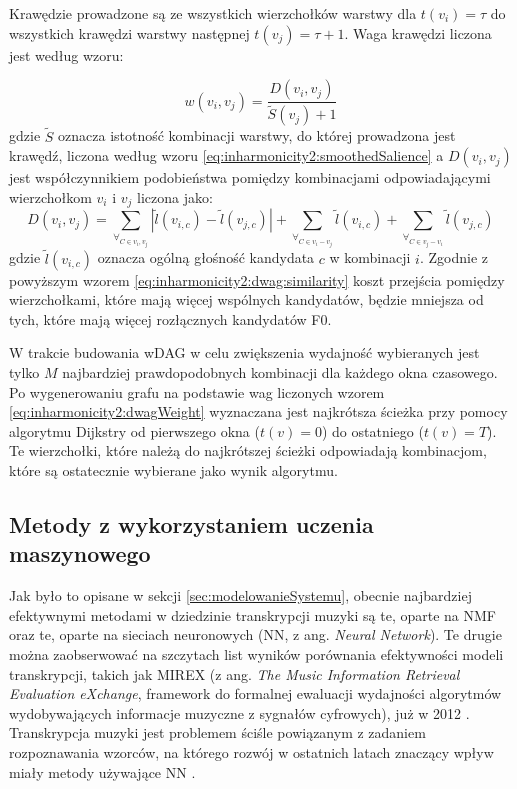 \documentclass[12pt,a4paper,twoside]{mwart}
\begin{document}
Krawędzie prowadzone są ze wszystkich wierzchołków warstwy dla $t(v_i) = \tau$ do wszystkich krawędzi warstwy następnej $t(v_j) = \tau + 1$. Waga krawędzi liczona jest według wzoru:

\begin{equation}\label{eq:inharmonicity2:dwagWeight}
w(v_i, v_j) = \frac{D(v_i, v_j)}{\widetilde{S}(v_j) + 1}
\end{equation}
gdzie $\widetilde{S}$ oznacza istotność kombinacji warstwy, do której prowadzona jest krawędź, liczona według wzoru \ref{eq:inharmonicity2:smoothedSalience} a $D(v_i, v_j)$ jest współczynnikiem podobieństwa pomiędzy kombinacjami odpowiadającymi wierzchołkom $v_i$ i $v_j$ liczona jako:
\begin{equation}\label{eq:inharmonicity2:dwag:similarity}
D(v_i, v_j) = \sum_{\forall_{C\in v_i, v_j}}\left|\widetilde{l}(v_{i,c}) - \widetilde{l}(v_{j,c}) \right| + \sum_{\forall_{C\in v_i - v_j}}\widetilde{l}(v_{i,c}) + \sum_{\forall_{C\in v_j - v_i}}\widetilde{l}(v_{j,c})
\end{equation}
gdzie $\widetilde{l}(v_{i,c})$ oznacza ogólną głośność kandydata $c$ w kombinacji $i$. Zgodnie z powyższym wzorem \ref{eq:inharmonicity2:dwag:similarity} koszt przejścia pomiędzy wierzchołkami, które mają więcej wspólnych kandydatów, będzie mniejsza od tych, które mają więcej rozłącznych kandydatów F0.

W trakcie budowania wDAG w celu zwiększenia wydajność wybieranych jest tylko $M$ najbardziej prawdopodobnych kombinacji dla każdego okna czasowego. Po wygenerowaniu grafu na podstawie wag liczonych wzorem \ref{eq:inharmonicity2:dwagWeight} wyznaczana jest najkrótsza ścieżka przy pomocy algorytmu Dijkstry \cite{Transcription:Dijkstra:Graphs} od pierwszego okna ($t(v) = 0$) do ostatniego ($t(v) = T$). Te wierzchołki, które należą do najkrótszej ścieżki odpowiadają kombinacjom, które są ostatecznie wybierane jako wynik algorytmu.

\subsection{Metody z wykorzystaniem uczenia maszynowego}
Jak było to opisane w sekcji \ref{sec:modelowanieSystemu}, obecnie najbardziej efektywnymi metodami w dziedzinie transkrypcji muzyki są te, oparte na NMF oraz te, oparte na sieciach neuronowych (NN, z ang. \textit{Neural Network}). Te drugie można zaobserwować na szczytach list wyników porównania efektywności modeli transkrypcji, takich jak MIREX (z ang. \textit{The Music Information Retrieval Evaluation eXchange}, framework do formalnej ewaluacji wydajności algorytmów wydobywających informacje muzyczne z sygnałów cyfrowych), już w 2012 
\cite[415-416]{Transcription:Klapuri:ChallengesAndFuture}
. Transkrypcja muzyki jest problemem ściśle powiązanym z zadaniem rozpoznawania wzorców, na którego rozwój w ostatnich latach znaczący wpływ miały metody używające NN 
\cite[26-28]{DBLP:journals/spm/BenetosDDE19}
.
\end{document}
